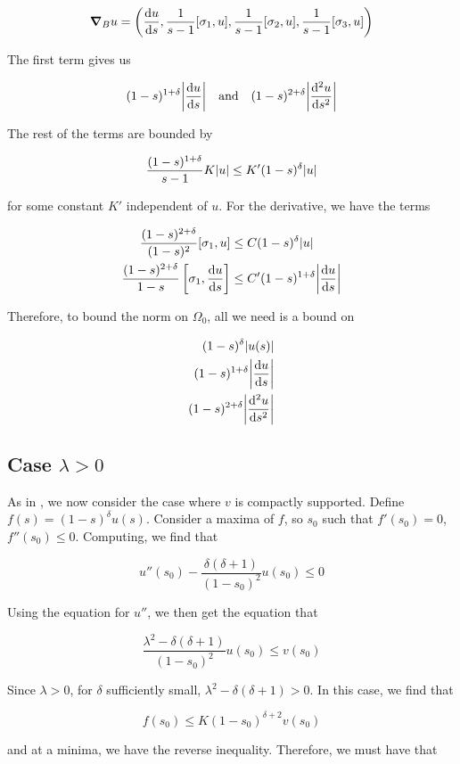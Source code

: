 \documentclass{report}
\begin{document}
\[\grad_Bu = \left(\dv{u}{s}, \frac{1}{s-1}[\sigma_1, u], \frac{1}{s-1}[\sigma_2, u], \frac{1}{s-1}[\sigma_3, u]\right)\]

The first term gives us

\[(1-s)^{1+\delta}\abs{\dv{u}{s}} \qqtext{and} (1-s)^{2+\delta}\abs{\dv[2]{u}{s}}\]

The rest of the terms are bounded by

\[\frac{(1-s)^{1+\delta}}{s-1} K \abs{u} \le K'(1-s)^\delta\abs{u}\]

for some constant \(K'\) independent of \(u\). For the derivative, we have the terms

\begin{align*}
    \frac{(1-s)^{2 + \delta}}{(1-s)^2}[\sigma_1, u] &\le C(1-s)^\delta\abs{u} \\
    \frac{(1-s)^{2 + \delta}}{1-s}\left[\sigma_1, \dv{u}{s}\right] & \le C'(1-s)^{1+\delta}\abs{\dv{u}{s}}
\end{align*}

Therefore, to bound the norm on \(\Omega_0\), all we need is a bound on

\begin{align*}
    (1-s)^\delta\abs{u(s)} \\
    (1-s)^{1+\delta}\abs{\dv{u}{s}} \\
    (1-s)^{2 + \delta}\abs{\dv[2]{u}{s}}
\end{align*}

\subsection{Case \(\lambda > 0\)}

As in \cite{kronheimer_hyper-kahlerian_1990}, we now consider the case where \(v\) is compactly supported. Define \(f(s) = (1-s)^\delta u(s)\). Consider a maxima of \(f\), so \(s_0\) such that \(f'(s_0) = 0\), \(f''(s_0) \le 0\). Computing, we find that

\[u''(s_0) - \frac{\delta(\delta+1)}{(1-s_0)^2}u(s_0) \le 0\]

Using the equation for \(u''\), we then get the equation that

\[\frac{\lambda^2 - \delta(\delta+1)}{(1-s_0)^2}u(s_0) \le v(s_0)\]

Since \(\lambda > 0\), for \(\delta\) sufficiently small, \(\lambda^2 - \delta(\delta+1) > 0\). In this case, we find that

\[f(s_0) \le K(1-s_0)^{\delta+2}v(s_0)\]

and at a minima, we have the reverse inequality. Therefore, we must have that
\end{document}

